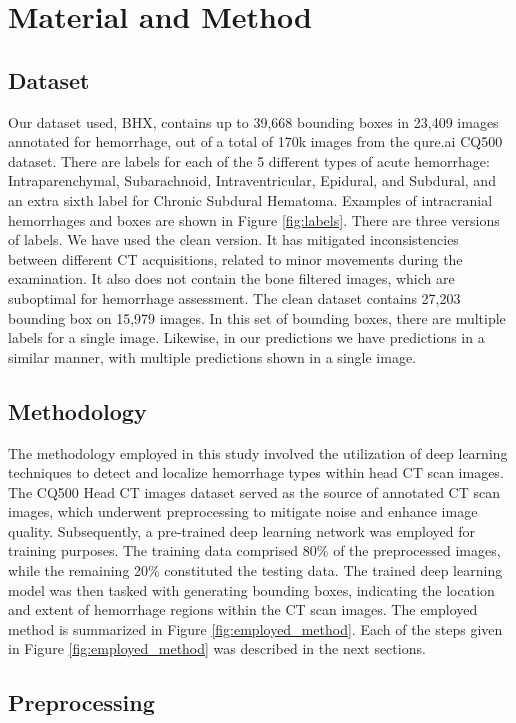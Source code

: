 \documentclass[Print]{../Style/isecure-v24}
\begin{document}
\section{Material and Method} \label{sec:material and method}
\subsection{Dataset} \label{sec:Dataset} 
Our dataset used, BHX, contains up to 39,668 bounding boxes in 23,409 images annotated for hemorrhage, out of a total of 170k images from the qure.ai CQ500 dataset. There are labels for each of the 5 different types of acute hemorrhage: Intraparenchymal, Subarachnoid, Intraventricular, Epidural, and Subdural, and an extra sixth label for Chronic Subdural Hematoma. Examples of intracranial hemorrhages and boxes are shown in Figure \ref{fig:labels}.
There are three versions of labels. We have used the clean version. It has mitigated inconsistencies between different CT acquisitions, related to minor movements during the examination. It also does not contain the bone filtered images, which are suboptimal for hemorrhage assessment. The clean dataset contains 27,203 bounding box on 15,979 images. In this set of bounding boxes, there are multiple labels for a single image. Likewise, in our predictions we have predictions in a similar manner, with multiple predictions shown in a single image. 

\subsection{ Methodology} \label{sec: Methodology} 
The methodology employed in this study involved the utilization of deep learning techniques to detect and localize hemorrhage types within head CT scan images. The CQ500 Head CT images dataset served as the source of annotated CT scan images, which underwent preprocessing to mitigate noise and enhance image quality. Subsequently, a pre-trained deep learning network was employed for training purposes. The training data comprised 80\% of the preprocessed images, while the remaining 20\% constituted the testing data. The trained deep learning model was then tasked with generating bounding boxes, indicating the location and extent of hemorrhage regions within the CT scan images. 
The employed method is summarized in Figure \ref{fig:employed_method}. Each of the steps given in Figure \ref{fig:employed_method} was described in the next sections.

\subsection{Preprocessing} \label{sec: Preprocessing}
\end{document}
